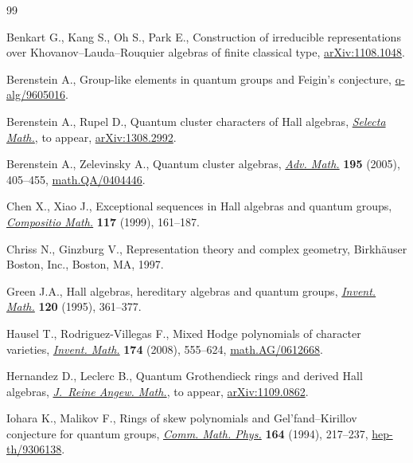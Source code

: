 \documentclass[pdftex]{sigma}
\numberwithin{equation}{section}
\begin{document}
\begin{thebibliography}{99}
\footnotesize \itemsep=0pt

Benkart G., Kang S., Oh S., Park E., Construction of irreducible
  representations over Khovanov--Lauda--Rouquier algebras of f\/inite classical
  type, \href{http://arxiv.org/abs/1108.1048}{arXiv:1108.1048}.

Berenstein A., Group-like elements in quantum groups and Feigin's conjecture,
  \href{http://arxiv.org/abs/q-alg/9605016}{q-alg/9605016}.

Berenstein A., Rupel D., Quantum cluster characters of Hall algebras,
  \href{http://dx.doi.org/10.1007/s00029-014-0177-3}{\textit{Selecta Math.}}, {t}o appear, \href{http://arxiv.org/abs/1308.2992}{arXiv:1308.2992}.

Berenstein A., Zelevinsky A., Quantum cluster algebras, \href{http://dx.doi.org/10.1016/j.aim.2004.08.003}{\textit{Adv. Math.}}
  \textbf{195} (2005), 405--455, \href{http://arxiv.org/abs/math.QA/0404446}{math.QA/0404446}.

Chen X., Xiao J., Exceptional sequences in {H}all algebras and quantum groups,
  \href{http://dx.doi.org/10.1023/A:1000947529874}{\textit{Compositio Math.}} \textbf{117} (1999), 161--187.

Chriss N., Ginzburg V., Representation theory and complex geometry,
  Birkh\"auser Boston, Inc., Boston, MA, 1997.

Green J.A., Hall algebras, hereditary algebras and quantum groups,
  \href{http://dx.doi.org/10.1007/BF01241133}{\textit{Invent. Math.}} \textbf{120} (1995), 361--377.

Hausel T., Rodriguez-Villegas F., Mixed {H}odge polynomials of character
  varieties, \href{http://dx.doi.org/10.1007/s00222-008-0142-x}{\textit{Invent. Math.}} \textbf{174} (2008), 555--624,
  \href{http://arxiv.org/abs/math.AG/0612668}{math.AG/0612668}.

Hernandez D., Leclerc B., Quantum Grothendieck rings and derived Hall algebras,
  \href{http://dx.doi.org/10.1515/crelle-2013-0020}{\textit{J.~Reine Angew. Math.}}, {t}o appear, \href{http://arxiv.org/abs/1109.0862}{arXiv:1109.0862}.

Iohara K., Malikov F., Rings of skew polynomials and {G}el'fand--{K}irillov
  conjecture for quantum groups, \href{http://dx.doi.org/10.1007/BF02101700}{\textit{Comm. Math. Phys.}} \textbf{164}
  (1994), 217--237, \href{http://arxiv.org/abs/hep-th/9306138}{hep-th/9306138}.


\end{thebibliography}
\end{document}
